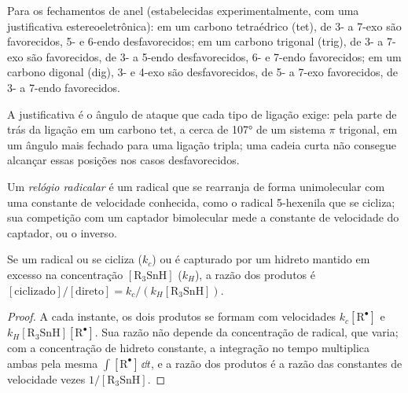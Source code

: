 \begin{proposition}\label{prop:b3:radicals-carbenes:baldwin}
Para os fechamentos de anel (estabelecidas experimentalmente, com uma justificativa
estereoeletrônica): em um carbono tetraédrico (tet), de 3- a 7-exo são favorecidos, 5- e
6-endo desfavorecidos; em um carbono trigonal (trig), de 3- a 7-exo são favorecidos, de 3- a 5-endo
desfavorecidos, 6- e 7-endo favorecidos; em um carbono digonal (dig), 3- e 4-exo são
desfavorecidos, de 5- a 7-exo favorecidos, de 3- a 7-endo favorecidos.
\end{proposition}

A justificativa é o ângulo de ataque que cada tipo de ligação exige: pela parte de trás da
ligação em um carbono tet, a cerca de 107° de um sistema $\pi$ trigonal, em um ângulo mais
fechado para uma ligação tripla; uma cadeia curta não consegue alcançar essas posições nos
casos desfavorecidos.

\begin{definition}\label{def:b3:radicals-carbenes:radical-clock}
Um \emph{relógio radicalar} é um radical que se rearranja
de forma unimolecular com uma constante de velocidade conhecida, como o radical 5-hexenila
que se cicliza; sua competição com um captador bimolecular mede a constante de velocidade
do captador, ou o inverso.
\end{definition}

\begin{proposition}\label{prop:b3:radicals-carbenes:clock}
Se um radical ou se cicliza ($k_c$) ou é capturado por um hidreto mantido em excesso na
concentração $[\mathrm{R_3SnH}]$ ($k_H$), a razão dos produtos é
$[\text{ciclizado}]/[\text{direto}] = k_c/(k_H[\mathrm{R_3SnH}])$.
\end{proposition}

\begin{proof}
A cada instante, os dois produtos se formam com velocidades $k_c[\mathrm R^\bullet]$ e $k_H[\mathrm{R_3SnH}][\mathrm R^\bullet]$. Sua razão
não depende da concentração de radical, que varia; com a concentração de hidreto
constante, a integração no tempo multiplica ambas pela mesma
$\int[\mathrm R^\bullet]\,\dd t$, e a razão dos produtos é a razão das constantes de velocidade
vezes $1/[\mathrm{R_3SnH}]$.
\end{proof}

